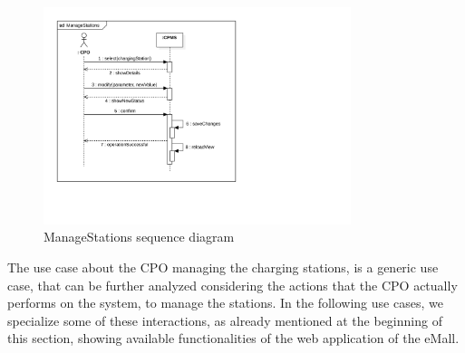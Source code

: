 \begin{figure}[H]
    \centering
    \includegraphics[width=0.8\textwidth, trim={0 4cm 11cm 0}, clip]{Images/cp3/seqDiagrams/ManageStations.pdf}
    \caption{ManageStations sequence diagram}
\end{figure}

The use case about the CPO managing the charging stations, is a generic use case, that can be further analyzed considering the actions that the CPO actually performs on the system, to manage the stations. In the following use cases, we specialize some of these interactions, as already mentioned at the beginning of this section, showing available functionalities of the web application of the eMall. 

